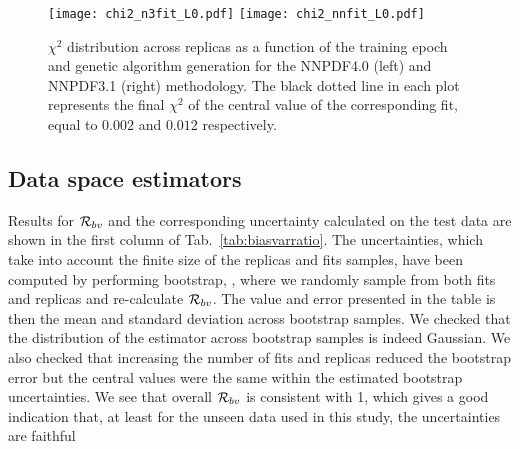 \begin{figure*}[h]
    \centering
    \texttt{[image: chi2\_n3fit\_L0.pdf]}
    \texttt{[image: chi2\_nnfit\_L0.pdf]}
    \caption{$\chi^2$ distribution across replicas as a function of the training
    epoch and genetic algorithm generation for the NNPDF4.0 (left) and NNPDF3.1
    (right) methodology. The black dotted line
    in each plot represents the final $\chi^2$ of the central value of the
    corresponding fit, equal to $0.002$ and $0.012$ respectively.}
    \label{fig:chi2_vs_epoch}    
\end{figure*}



\subsection{Data space estimators}

Results for $\mathcal{R}_{bv}$ and the corresponding uncertainty calculated on the
test data are shown in the first column of Tab.~\ref{tab:biasvarratio}.
The uncertainties, which take into account the finite size of the replicas and fits samples,
have been computed by performing bootstrap, 
\cite{efron1994introduction}, where we randomly sample from both fits and
replicas and re-calculate $\mathcal{R}_{bv}$. The value and error presented in the
table is then the mean and standard deviation across bootstrap samples. We
checked that the distribution of the estimator across bootstrap samples is
indeed Gaussian. We also checked that increasing the number of fits and replicas
reduced the bootstrap error but the central values were the same within the
estimated bootstrap uncertainties. We see that overall $\mathcal{R}_{bv}$  is
consistent with 1, which gives a good indication that, at least for the unseen
data used in this study, the uncertainties are faithful


